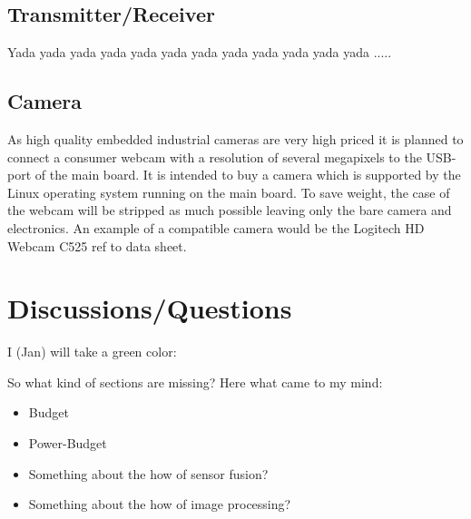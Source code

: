 \documentclass[fontsize=11pt,paper=a4,]{scrartcl}
\begin{document}
\subsection*{Transmitter/Receiver}

Yada yada yada yada yada yada yada yada yada yada yada yada .....

\subsection*{Camera}

As high quality embedded industrial cameras are very high priced it is planned to connect a consumer webcam with a resolution of several megapixels to the USB-port of the main board. It is intended to buy a camera which is supported by the Linux operating system running on the main board. To save weight, the case of the webcam will be stripped as much possible leaving only the bare camera and electronics. An example of a compatible camera would be the Logitech HD Webcam C525 {\color{red} ref to data sheet}.


\section{Discussions/Questions}

I (Jan) will take {\color{green} a green color}:

{\color{green} So what kind of sections are missing? Here what came to my mind:
\begin{itemize}
 \item Budget
 \item Power-Budget
 \item Something about the how of sensor fusion?
 \item Something about the how of image processing?
\end{itemize}
}
\end{document}
